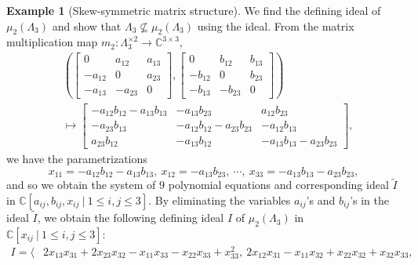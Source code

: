 \documentclass[reqno]{amsart}
\theoremstyle{definition}
\newtheorem{example}[theorem]{Example}
\numberwithin{equation}{section}
\begin{document}
\begin{example}[Skew-symmetric matrix structure]\label{ex:defining equations for skew-symmetric matrix structure}
    We find the defining ideal of $\mu_2(\Lambda_3)$ and show that $\Lambda_3 \nsubseteq \mu_2(\Lambda_3)$ using the ideal. From the matrix multiplication map $m_2:\Lambda_3^{\times 2} \rightarrow \mathbb{C}^{3 \times 3}$,
    \begin{equation*}
    \begin{aligned}
        &\left(\begin{bmatrix}
            0 & a_{12} & a_{13}\\
            -a_{12} & 0 & a_{23}\\
            -a_{13} & -a_{23} & 0
        \end{bmatrix}, \begin{bmatrix}
            0 & b_{12} & b_{13}\\
            -b_{12} & 0 & b_{23}\\
            -b_{13} & -b_{23} & 0
        \end{bmatrix}\right) \\
        &\mapsto \begin{bmatrix}
            -a_{12}b_{12}-a_{13}b_{13} & -a_{13}b_{23} & a_{12}b_{23}\\
            -a_{23}b_{13} & -a_{12}b_{12}-a_{23}b_{23} & -a_{12}b_{13}\\
            a_{23}b_{12}& -a_{13}b_{12} & -a_{13}b_{13}-a_{23}b_{23}
        \end{bmatrix},
    \end{aligned}
    \end{equation*}
    we have the parametrizations
    \begin{equation*}
        x_{11}=-a_{12}b_{12}-a_{13}b_{13},~ x_{12}=-a_{13}b_{23},~ \cdots,~ x_{33}=-a_{13}b_{13}-a_{23}b_{23},
    \end{equation*}
    and so we obtain the system of $9$ polynomial equations and corresponding ideal $\tilde{I}$ in $\mathbb{C}[a_{ij},b_{ij},x_{ij}~|~1 \leq i,j \leq 3]$. By eliminating the variables $a_{ij}$'s and $b_{ij}$'s in the ideal $\tilde{I}$, we obtain the following defining ideal $I$ of $\mu_2(\Lambda_3)$ in $\mathbb{C}[x_{ij}~|~1 \leq i,j \leq 3]$:
    \begin{equation*}
    \begin{aligned}
        I=\langle & 2x_{13}x_{31}+2x_{23}x_{32}-x_{11}x_{33}-x_{22}x_{33}+x_{33}^2,~2x_{12}x_{31}-x_{11}x_{32}+x_{22}x_{32}+x_{32}x_{33},\\

\end{aligned}
\end{equation*}
\end{example}
\end{document}
